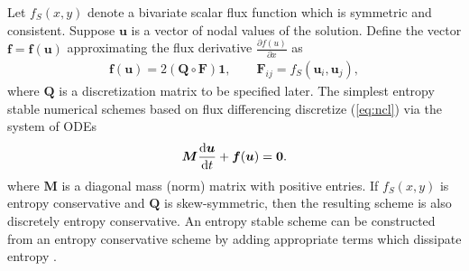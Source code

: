 \documentclass{article}
\newcommand{\td}[2]{\frac{{\rm d}#1}{{\rm d}{ {#2}}}}
\newcommand{\pd}[2]{\frac{\partial#1}{\partial#2}}
\newcommand{\LRp}[1]{\left( #1 \right)}
\newcommand{\eqlab}[1]{\begin{align}#1\end{align}}
\begin{document}
Let $f_S(x,y)$ denote a bivariate scalar flux function which is symmetric and consistent.  Suppose $\bm{u}$ is a vector of nodal values of the solution.  Define the vector $\bm{f} = \bm{f}(\bm{u})$ approximating the flux derivative $\pd{f(u)}{x}$ as 
\eqlab{
\bm{f}(\bm{u}) = 2\LRp{\bm{Q}\circ \bm{F}}\bm{1}, \qquad \bm{F}_{ij} = f_S(\bm{u}_i,\bm{u}_j),
\label{eq:fu}
}
where $\bm{Q}$ is a discretization matrix to be specified later.  The simplest entropy stable numerical schemes based on flux differencing discretize (\ref{eq:ncl}) via the system of ODEs
\[
\bm{M}\td{\bm{u}}{t} + \bm{f}(\bm{u}) = \bm{0}.
\]
where $\bm{M}$ is a diagonal mass (norm) matrix with positive entries.  If $f_S(x,y)$ is entropy conservative and $\bm{Q}$ is skew-symmetric, then the resulting scheme is also discretely entropy conservative.  An entropy stable scheme can be constructed from an entropy conservative scheme by adding appropriate terms which dissipate entropy \cite{chen2017entropy, upperman2019entropy, hicken2020entropy}. 
\end{document}
